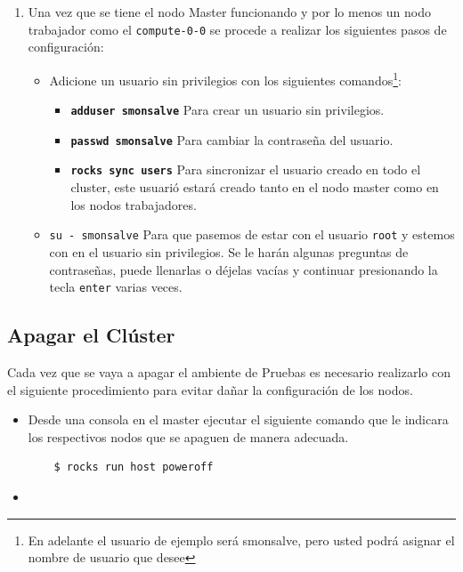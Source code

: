 \begin{enumerate}
	\item Una vez que se tiene el nodo Master funcionando y por lo menos un nodo trabajador como el \texttt{compute-0-0} se procede a realizar los siguientes pasos de configuración:

	\begin{itemize}
	\item Adicione un usuario sin privilegios con los siguientes comandos\footnote{En adelante el usuario de ejemplo será smonsalve, pero usted podrá asignar el nombre de usuario que desee}:

	\begin{itemize}
		\item \textbf{\texttt{adduser smonsalve}} Para crear un usuario sin privilegios.

		\item \textbf{\texttt{passwd smonsalve}} Para cambiar la contraseña del usuario.

		\item \textbf{\texttt{rocks sync users}} Para sincronizar el usuario creado en todo el cluster, este usuarió estará creado tanto en el nodo master como en los nodos trabajadores.
	\end{itemize}

	\item \texttt{su - smonsalve} Para que pasemos de estar con el usuario \texttt{root} y estemos con en el usuario sin privilegios. Se le harán algunas preguntas de contraseñas, puede llenarlas o déjelas vacías y continuar presionando la tecla \texttt{enter} varias veces.
	\end{itemize}
	
\end{enumerate}

\subsection{Apagar el Clúster}

Cada vez que se vaya a apagar el ambiente de Pruebas es necesario realizarlo con el siguiente procedimiento para evitar dañar la configuración de los nodos. 

\begin{itemize}
	\item Desde una consola en el master ejecutar el siguiente comando que le indicara los respectivos nodos que se apaguen de manera adecuada. 

	 \begin{verbatim}
	$ rocks run host poweroff
 	\end{verbatim}

 	\item 
  
\end{itemize}







